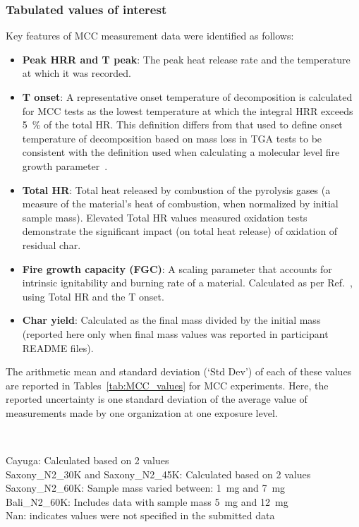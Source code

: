 \documentclass{book}
\begin{document}
\clearpage
\subsubsection{Tabulated values of interest}
Key features of MCC measurement data were identified as follows:
\begin{itemize}
	\item \textbf{Peak HRR and T peak}: The peak heat release rate and the temperature at which it was recorded.
	\item \textbf{T onset}: A representative onset temperature of decomposition is calculated for MCC tests as the lowest temperature at which the integral HRR exceeds 5~\% of the total HR. This definition differs from that used to define onset temperature of decomposition based on mass loss in TGA tests to be consistent with the definition used when calculating a molecular level fire growth parameter~\cite{lyon2021molecular}.
	\item \textbf{Total HR}: Total heat released by combustion of the pyrolysis gases (a measure of the material's heat of combustion, when normalized by initial sample mass). Elevated Total HR values measured oxidation tests demonstrate the significant impact (on total heat release) of oxidation of residual char.
	\item \textbf{Fire growth capacity (FGC)}: A scaling parameter that accounts for intrinsic ignitability and burning rate of a material. Calculated as per Ref.~\cite{lyon2021molecular}, using Total HR and the T onset.
	\item \textbf{Char yield}: Calculated as the final mass divided by the initial mass (reported here only when final mass values was reported in participant README files).
\end{itemize}

The arithmetic mean and standard deviation (`Std Dev') of each of these values are reported in Tables~\ref{tab:MCC_values} for MCC experiments. Here, the reported uncertainty is one standard deviation of the average value of measurements made by one organization at one exposure level.




\begin{landscape}
	\begin{table}[htbp]
		\centering
		\caption{Tabulated values of interest for MCC experiments.}
		\label{tab:MCC_values}
		\small
		\\
		\raggedright
		Cayuga: Calculated based on 2 values\\
		Saxony\_N2\_30K and Saxony\_N2\_45K: Calculated based on 2 values\\
		Saxony\_N2\_60K: Sample mass varied between: 1~mg and 7~mg\\
		Bali\_N2\_60K: Includes data with sample mass 5~mg and 12~mg\\
		Nan: indicates values were not specified in the submitted data
	\end{table}
\end{landscape}
\end{document}
